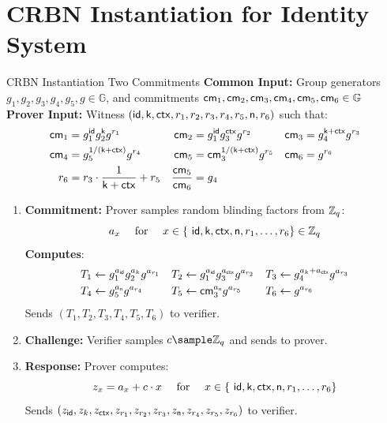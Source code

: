 \section{CRBN Instantiation for Identity System}

\begin{protocol}{CRBN Instantiation Two Commitments}{}\label{crbn-instantiation}
\textbf{Common Input:} Group generators $g_1, g_2, g_3, g_4, g_5, g \in \mathbb{G}$, and commitments $\mathsf{cm}_1, \mathsf{cm}_2, \mathsf{cm}_3, \mathsf{cm}_4, \mathsf{cm}_5, \mathsf{cm}_6 \in \mathbb{G}$\\
\textbf{Prover Input:} Witness $(\mathsf{id}, \mathsf{k}, \mathsf{ctx}, r_1, r_2, r_3, r_4, r_5, \textsf{n}, r_6)$ such that:
    \begin{align*}
        \mathsf{cm}_1 &= g_1^{\mathsf{id}} g_2^{\mathsf{k}} g^{r_1}     &    \mathsf{cm}_2 &= g_1^{\mathsf{id}} g_3^{\mathsf{ctx}} g^{r_2}  &   \mathsf{cm}_3 &= g_4^{\mathsf{k} + \mathsf{ctx}} g^{r_3}\\
        \mathsf{cm}_4 &= g_5^{1/(\mathsf{k} + \mathsf{ctx})} g^{r_4}   &   \mathsf{cm}_5 &= \mathsf{cm}_3^{1/(\mathsf{k} + \mathsf{ctx})} g^{r_5}     &   \mathsf{cm}_6 &= g^{r_6} \\
       r_6 &= r_3 \cdot \frac{1}{\mathsf{k} + \mathsf{ctx}} + r_5    &   \frac{\mathsf{cm}_5}{\mathsf{cm}_6} &= g_4
    \end{align*}

\begin{enumerate}
    \item \textbf{Commitment:} Prover samples random blinding factors from $\mathbb{Z}_q$:
    \[
        a_x \quad \text{ for } \quad x \in \{\ \mathsf{id}, \mathsf{k}, \mathsf{ctx}, \textsf{n}, r_1, \ldots,r_6\} \in \mathbb{Z}_q
    \]
    \textbf{Computes}:
    \begin{align*}
        T_1 &\gets g_1^{a_{\mathsf{id}}} g_2^{a_k} g^{a_{r_1}}  &   T_2 &\gets g_1^{a_{\mathsf{id}}} g_3^{a_{\mathsf{ctx}}} g^{a_{r_2}}     &   T_3 &\gets g_4^{a_k + a_{\mathsf{ctx}}} g^{a_{r_3}} \\
        T_4 &\gets g_5^{a_{\textsf{n}}} g^{a_{r_4}}   &   T_5 &\gets \mathsf{cm}_3^{a_{\textsf{n}}} g^{a_{r_5}}     &   T_6 &\gets g^{a_{r_6}}
    \end{align*}
    Sends $(T_1, T_2, T_3, T_4, T_5, T_6)$ to verifier.
    
    \item \textbf{Challenge:} Verifier samples $c \sample \mathbb{Z}_q$ and sends to prover.
    
    \item \textbf{Response:} Prover computes:
    \[
    z_x = a_x + c \cdot x \quad \text{ for } \quad x \in \{\ \mathsf{id}, \mathsf{k}, \mathsf{ctx}, \textsf{n}, r_1, \ldots,r_6\} 
    \]
    Sends $(z_{\mathsf{id}}, z_k, z_{\mathsf{ctx}}, z_{r_1}, z_{r_2}, z_{r_3}, z_{\textsf{n}}, z_{r_4}, z_{r_5}, z_{r_6})$ to verifier.
    

\end{enumerate}
\end{protocol}
